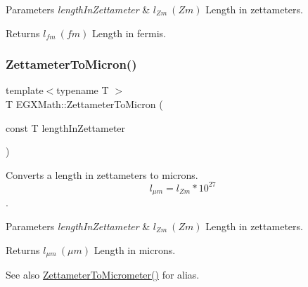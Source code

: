 \begin{DoxyParams}{Parameters}
{\em length\+In\+Zettameter} & $ l_{Zm}\ (Zm)$ Length in zettameters. \\
\hline
\end{DoxyParams}
\begin{DoxyReturn}{Returns}
$ l_{fm}\ (fm)$ Length in fermis. 
\end{DoxyReturn}
\mbox{\label{group___e_g_x_math-_conversions-_length_conversions-_s_i-_zettameter-_non-_s_i_gafede369c63111d97f92238e626cdfa87}} 
\subsubsection{\texorpdfstring{Zettameter\+To\+Micron()}{ZettameterToMicron()}}
{\footnotesize\ttfamily template$<$typename T $>$ \\
T E\+G\+X\+Math\+::\+Zettameter\+To\+Micron (\begin{DoxyParamCaption}\item[{const T}]{length\+In\+Zettameter }\end{DoxyParamCaption})}



Converts a length in zettameters to microns. \[ l_{\mu m}=l_{Zm} * 10^{27} \]. 


\begin{DoxyParams}{Parameters}
{\em length\+In\+Zettameter} & $ l_{Zm}\ (Zm)$ Length in zettameters. \\
\hline
\end{DoxyParams}
\begin{DoxyReturn}{Returns}
$ l_{\mu m}\ (\mu m)$ Length in microns. 
\end{DoxyReturn}
\begin{DoxySeeAlso}{See also}
\mbox{\hyperlink{group___e_g_x_math-_conversions-_length_conversions-_s_i-_zettameter-_s_i_ga495f68a50945d994b3f2d455b3348595}{Zettameter\+To\+Micrometer()}} for alias. 
\end{DoxySeeAlso}
\mbox{\label{group___e_g_x_math-_conversions-_length_conversions-_s_i-_zettameter-_non-_s_i_ga10039261b7de3417e69110a56312b9ef}} 
